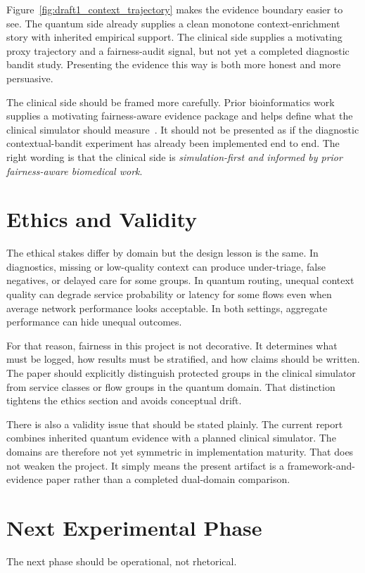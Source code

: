 \documentclass[conference]{IEEEtran}
\begin{document}
Figure~\ref{fig:draft1_context_trajectory} makes the evidence boundary easier to see. The quantum side already supplies a clean monotone context-enrichment story with inherited empirical support. The clinical side supplies a motivating proxy trajectory and a fairness-audit signal, but not yet a completed diagnostic bandit study. Presenting the evidence this way is both more honest and more persuasive.

The clinical side should be framed more carefully. Prior bioinformatics work supplies a motivating fairness-aware evidence package and helps define what the clinical simulator should measure~\cite{garcia2025equitable_bioinformatics}. It should not be presented as if the diagnostic contextual-bandit experiment has already been implemented end to end. The right wording is that the clinical side is \emph{simulation-first and informed by prior fairness-aware biomedical work}.

\section{Ethics and Validity}
The ethical stakes differ by domain but the design lesson is the same. In diagnostics, missing or low-quality context can produce under-triage, false negatives, or delayed care for some groups. In quantum routing, unequal context quality can degrade service probability or latency for some flows even when average network performance looks acceptable. In both settings, aggregate performance can hide unequal outcomes.

For that reason, fairness in this project is not decorative. It determines what must be logged, how results must be stratified, and how claims should be written. The paper should explicitly distinguish protected groups in the clinical simulator from service classes or flow groups in the quantum domain. That distinction tightens the ethics section and avoids conceptual drift.

There is also a validity issue that should be stated plainly. The current report combines inherited quantum evidence with a planned clinical simulator. The domains are therefore not yet symmetric in implementation maturity. That does not weaken the project. It simply means the present artifact is a framework-and-evidence paper rather than a completed dual-domain comparison.

\section{Next Experimental Phase}
The next phase should be operational, not rhetorical.
\end{document}
